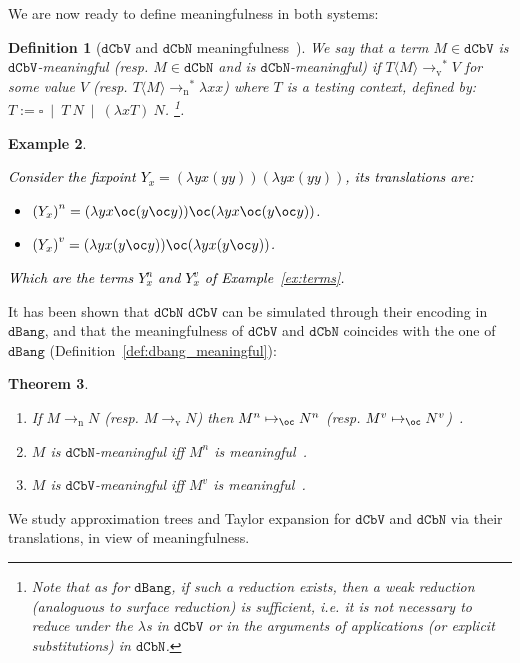 \documentclass[10pt,a4paper]{article}
\newtheorem{theorem}{Theorem}
\newtheorem{definition}[theorem]{Definition}
\newtheorem{example}[theorem]{Example}
\newcommand{\<}{\langle}
\renewcommand{\>}{\rangle}
\newcommand{\alt}{~\mid~}
\newcommand{\dcbn}{\ensuremath{\mathtt{dCbN}}}
\newcommand{\dcbv}{\ensuremath{\mathtt{dCbV}}}
\newcommand{\dbang}{\ensuremath{\mathtt{dBang}}}
\newcommand{\ton}{\ensuremath{\to_{\text{n}}}}
\newcommand{\tov}{\ensuremath{\to_{\text{v}}}}
\newcommand{\todb}{\mapsto_{\oc}} %
\newcommand{\tradv}[1]{\ensuremath{{#1}^v}}
\newcommand{\tradn}[1]{\ensuremath{{#1}^n}}
\newcommand{\fnl}[1]{\textcolor{black}{#1}}
\begin{document}
We are now ready to define meaningfulness in both systems:
\begin{definition}[\dcbv{} and \dcbn{} meaningfulness~\cite{kag24}]
	\label{def:dcbn-dcbv-meaningfulness}
	We say that a term $M \in \dcbv{}$ is \dcbv-meaningful (resp.
	$M\in\dcbn{}$ and is \dcbn-meaningful) if $T\langle M \rangle
	\tov^* V$ for some value $V$ (resp. $T\langle M \rangle \ton^*
	\lambda xx$) where $T$ is a testing context, defined by: $T :=
	\square \alt T~N \alt (\lambda x T)~N$.
	\footnote{
		Note that as for \dbang, if such a reduction exists, then 
		a weak reduction (analoguous to surface
		reduction) is sufficient, \emph{i.e.} it is not necessary to reduce under
		the $\lambda$s in $\dcbv$ or in the arguments of applications (or explicit
		substitutions) in \dcbn.
	}.
\end{definition}
\begin{example}
\fnl{ Consider the fixpoint $Y_x=(\lambda y x(yy))(\lambda y x(yy))$,
	its translations are:
	\begin{itemize}
		\item $\tradn{(Y_x)}=(\lambda yx\oc(y\oc y))\oc(\lambda y x\oc(y\oc y))$.
		\item $\tradv{(Y_x)}=(\lambda y x(y\oc y))\oc(\lambda y x(y\oc y))$.
	\end{itemize}
	Which are the terms $Y^n_x$ and $Y^v_x$ of
	Example~\ref{ex:terms}.}
\end{example}
It has been shown that \dcbn{} \dcbv{} can be simulated through their encoding
in \dbang{}, and that the meaningfulness of \dcbv{} and \dcbn{} coincides with
the one of \dbang{} (Definition~\ref{def:dbang_meaningful}):


\begin{theorem}~
	\label{thm:trad_meaningfulness}
	\begin{enumerate}
		\item If $M \ton N$ (resp. $M\tov N$) then $\tradn M \todb \tradn N$
		(resp. $\tradv M\todb\tradv N$)~\cite[Lemma 4.6]{bucciarelli2023bang}.
		\item $M$ is \dcbn{}-meaningful iff $M^n$ is meaningful~\cite[Theorem 25]{kag24}.
		\item $M$ is \dcbv{}-meaningful iff $M^v$ is meaningful~\cite[Theorem 30]{kag24}.
	\end{enumerate}
\end{theorem}

We study approximation trees and Taylor expansion for \dcbv{} and \dcbn{} via their translations, in view of meaningfulness.
\end{document}
